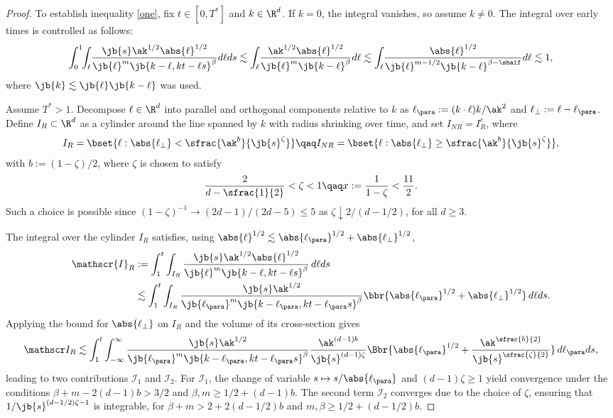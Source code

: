 \begin{proof}
To establish inequality \eqref{one}, fix $t\in[0,T^*]$ and $k\in\R^d$. If $k=0$, the integral vanishes, so assume $k\neq0$. The integral over early times is controlled as follows:
\begin{align*}
\int_0^1\hspace{-1mm}\int_\ell\!\frac{\jb{ s }\ak^{1/2}\abs{\ell}^{1/2}}{\jb{\ell}^m\jb{k-\ell,kt-\ell s }^{\beta}}d\ell d s \lesssim\int_\ell\!\frac{\ak^{1/2}\abs{\ell}^{1/2}}{\jb{\ell}^m\jb{k-\ell}^{\beta}}d\ell\lesssim\int_\ell\!\frac{\abs{\ell}^{1/2}}{\jb{\ell}^{m-{1/2}}\jb{k-\ell}^{\beta-\shalf}}d\ell\lesssim1,
\end{align*}where $\jb{k}\lesssim\jb{\ell}\jb{k-\ell}$ was used.

Assume $T^*>1$. Decompose $\ell\in\R^d$ into parallel and orthogonal components relative to $k$ as $\ell_\para:=(k\cdot\ell)k/\ak^2$ and $\ell_\perp:=\ell-\ell_\para$. Define $I_R\subset\R^d$ as a cylinder around the line spanned by $k$ with radius shrinking over time, and set $I_{NR}=I_R^c$, where
\begin{align*}
I_R=\bset{\ell:\abs{\ell_\perp}<\sfrac{\ak^b}{\jb{ s }^\zeta}}\qaq I_{NR}=\bset{\ell:\abs{\ell_\perp}\geq\sfrac{\ak^b}{\jb{ s }^\zeta}},
\end{align*}with $b:=(1-\zeta)/2$, where $\zeta$ is chosen to satisfy
\begin{align*}
\frac{2}{d-\sfrac{1}{2}}<\zeta<1\qaq x:=\frac{1}{1-\zeta}<\frac{11}{2}.
\end{align*}
Such a choice is possible since $(1-\zeta)^{-1}\to(2d-1)/(2d-5)\leq5$ as $\zeta\downarrow2/(d-1/2)$, for all $d\geq3$.

The integral over the cylinder $I_R$ satisfies, using $\abs{\ell}^{1/2}\lesssim\abs{\ell_\para}^{1/2}+\abs{\ell_\perp}^{1/2}$,
\begin{align*}
\mathscr{I}_R&:=\int_1^t\int_{I_R}\frac{\jb{ s }\ak^{1/2}\abs{\ell}^{1/2}}{\jb{\ell}^m\jb{k-\ell,kt-\ell s}^{\beta}}\,d\ell d s\\
&\lesssim\int_1^t\int_{I_R}\frac{\jb{ s }\ak^{1/2}}{\jb{\ell_\para}^m\jb{k-\ell_\para,kt-\ell_\para s }^\beta}\bbr{\abs{\ell_\para}^{1/2}+\abs{\ell_\perp}^{1/2}}\,d\ell d s.
\end{align*}
Applying the bound for $\abs{\ell_\perp}$ on $I_R$ and the volume of its cross-section gives
\begin{align*}
\mathscr I_R\lesssim\int_1^t\int_{-\infty}^\infty\frac{\jb{ s }\ak^{1/2}}{\jb{\ell_\para}^m\jb{k-\ell_\para,kt-\ell_\para s }^\beta}\frac{\ak^{(d-1)b}}{\jb{ s }^{(d-1)\zeta}}\Bbr{\abs{\ell_\para}^{1/2}+\frac{\ak^{\sfrac{b}{2}}}{\jb{ s }^{\sfrac{\zeta}{2}}}}\,d\ell_\para d s,
\end{align*}
leading to two contributions $\mathscr I_1$ and $\mathscr I_2$. For $\mathscr I_1$, the change of variable $ s \mapsto s /\abs{\ell_\para}$ and $(d-1)\zeta\geq1$ yield convergence under the conditions $\beta+m-2(d-1)b>3/2$ and $\beta,m\geq1/2+(d-1)b$. The second term $\mathscr I_2$ converges due to the choice of $\zeta$, ensuring that $1/\jb{ s }^{(d-1/2)\zeta-1}$ is integrable, for $\beta+m>2+2(d-1/2)b$ and $m,\beta\geq 1/2+(d-1/2)b$.


\end{proof}
